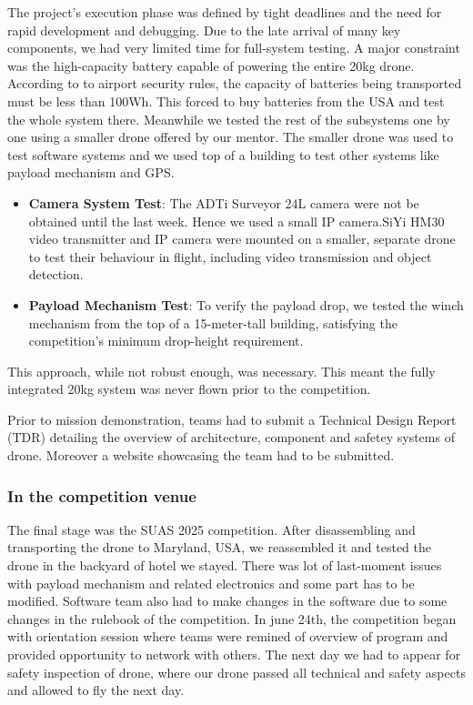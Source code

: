 The project's execution phase was defined by tight deadlines and the need for rapid development and debugging. Due to the late arrival of many key components, we had very limited time for full-system testing. A major constraint was the high-capacity battery capable of powering the entire 20kg drone. According to to airport security rules, the capacity of batteries being transported must be less than 100Wh. This forced to buy batteries from the USA and test the whole system there. Meanwhile we tested the rest of the subsystems one by one using a smaller drone offered by our mentor. The smaller drone was used to test software systems and we used top of a building to test other systems like payload mechanism and GPS.
\begin{itemize}
	\item \textbf{Camera System Test}: The ADTi Surveyor 24L camera were not be obtained until the last week. Hence we used a small IP camera.SiYi HM30 video transmitter and IP camera were mounted on a smaller, separate drone to test their behaviour in flight, including video transmission and object detection.
	\item \textbf {Payload Mechanism Test}: To verify the payload drop, we tested the winch mechanism from the top of a 15-meter-tall building, satisfying the competition's minimum drop-height requirement.
\end{itemize}

This approach, while not robust enough, was necessary. This meant the fully integrated 20kg system was never flown prior to the competition.

Prior to mission demonstration, teams had to submit a Technical Design Report (TDR) detailing the overview of architecture, component and safetey systems of drone. Moreover a website showcasing the team had to be submitted.

\subsubsection{In the competition venue}

The final stage was the SUAS 2025 competition. After disassembling and transporting the drone to Maryland, USA, we reassembled it and tested the drone in the backyard of hotel we stayed. There was lot of last-moment issues with payload mechanism and related electronics and some part has to be modified. Software team also had to make changes in the software due to some changes in the rulebook of the competition. In june 24th, the competition began with orientation session where teams were remined of overview of program and provided opportunity to network with others. The next day we had to appear for safety inspection of drone, where our drone passed all technical and safety aspects and allowed to fly the next day.

